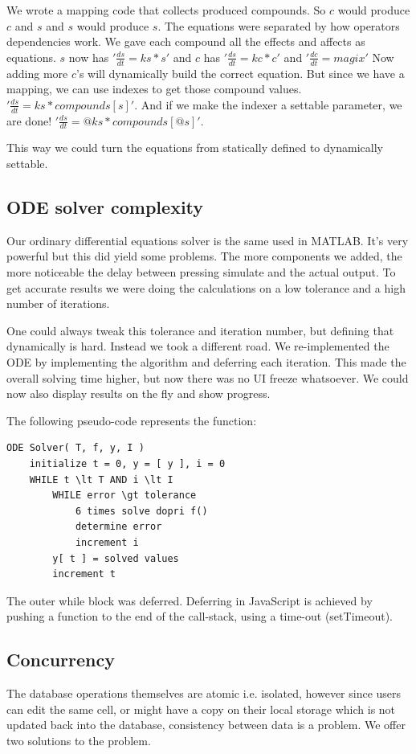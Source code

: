 \documentclass[10pt,a4paper]{report}
\begin{document}
			We wrote a mapping code that collects produced compounds. So $c$ would produce $c$ and $s$ and $s$ would produce $s$. The equations were separated by how operators dependencies work. We gave each compound all the effects and affects as equations. $s$ now has $'\frac{ds}{dt} = ks * s'$ and $c$ has $'\frac{ds}{dt} = kc * c'$ and $'\frac{dc}{dt} = magix'$ Now adding more $c$'s will dynamically build the correct equation. But since we have a mapping, we can use indexes to get those compound values. $'\frac{ds}{dt} = ks * compounds[s]'$. And if we make the indexer a settable parameter, we are done! $'\frac{ds}{dt} = @ks * compounds[@s]'$.
			
			This way we could turn the equations from statically defined to dynamically settable.
			
		\subsection{ODE solver complexity}
			Our ordinary differential equations solver is the same used in MATLAB. It's very powerful but this did yield some problems. The more components we added, the more noticeable the delay between pressing simulate and the actual output. To get accurate results we were doing the calculations on a low tolerance and a high number of iterations.
			
			One could always tweak this tolerance and iteration number, but defining that dynamically is hard. Instead we took a different road. We re-implemented the ODE by implementing the algorithm and deferring each iteration. This made the overall solving time higher, but now there was no UI freeze whatsoever. We could now also display results on the fly and show progress.
			
			The following pseudo-code represents the function:
			
			\begin{lstlisting}
ODE Solver( T, f, y, I )
	initialize t = 0, y = [ y ], i = 0
	WHILE t \lt T AND i \lt I
		WHILE error \gt tolerance
			6 times solve dopri f()
			determine error
			increment i
		y[ t ] = solved values
		increment t
			\end{lstlisting}

			The outer while block was deferred. Deferring in JavaScript is achieved by pushing a function to the end of the call-stack, using a time-out (setTimeout).
			\clearpage
		
		\subsection{Concurrency}
			The database operations themselves are atomic i.e. isolated, however since users can edit the same cell, or might have a copy on their local storage which is not updated back into the database, consistency between data is a problem. We offer two solutions to the problem.
			
\end{document}

